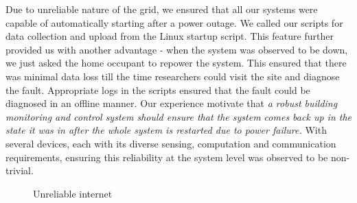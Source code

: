 \documentclass[10pt]{sensys-proc}
\begin{document}
\noindent Due to unreliable nature of the grid, we ensured that all our systems were capable of automatically starting after a power outage. We called our scripts for data collection and upload from the Linux startup script. This feature further provided us with another advantage - when the system was observed to be down, we just asked the home occupant to repower the system. This ensured that there was minimal data loss till the time researchers could visit the site and diagnose the fault. Appropriate logs in the scripts ensured that the fault could be diagnosed in an offline manner. Our experience motivate that \emph{a robust building monitoring and control system should ensure that the system comes back up in the state it was in after the whole system is restarted due to power failure.} With several devices, each with its diverse sensing, computation and communication requirements, ensuring this reliability at the system level was observed to be non-trivial.

\begin{figure}
\vspace{-4mm}
        \vspace{-3mm}
  \caption{Unreliable internet}
  \vspace{-2mm}
  
      \label{fig:unreliable_internet}
\end{figure}
\end{document}
